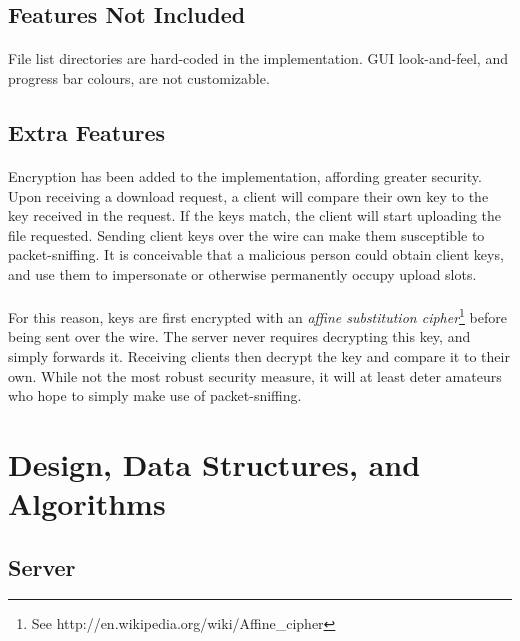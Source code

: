 \documentclass[10pt,a4paper]{article}
\begin{document}
\subsection{Features Not Included}
\paragraph{}
File list directories are hard-coded in the implementation. GUI look-and-feel, and progress bar colours, are not customizable.

\subsection{Extra Features}
\label{moar}
\paragraph{} 
Encryption has been added to the implementation, affording greater security. Upon receiving a download request, a client will compare their own key to the key received in the request. If the keys match, the client will start uploading the file requested. Sending client keys over the wire can make them susceptible to packet-sniffing. It is conceivable that a malicious person could obtain client keys, and use them to impersonate or otherwise permanently occupy upload slots.
\paragraph{}
For this reason, keys are first encrypted with an \emph{affine substitution cipher}\footnote{See http://en.wikipedia.org/wiki/Affine\_cipher}  before being sent over the wire. The server never requires decrypting this key, and simply forwards it. Receiving clients then decrypt the key and compare it to their own. While not the most robust security measure, it will at least deter amateurs who hope to simply make use of packet-sniffing.

\section{Design, Data Structures, and Algorithms}
\label{det}
\subsection{Server}
\end{document}
